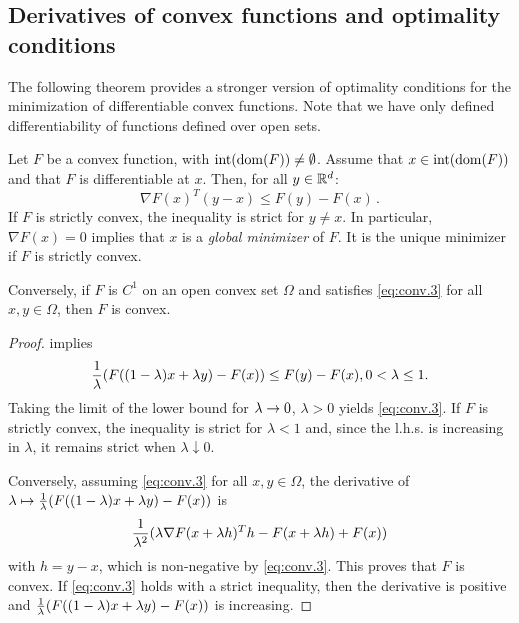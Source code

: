 \subsection{Derivatives of convex functions and optimality conditions}
 The following theorem provides a stronger version of optimality conditions for the minimization of differentiable convex functions. Note that we have only defined differentiability of functions defined over open sets. 
\begin{theorem}
Let $F$ be a convex function, with $\mathrm{int}({\mathrm{dom}}(F))\neq \emptyset$. Assume that
  $x\in \mathrm{int}({\mathrm{dom}}(F))$ and that $F$ is differentiable at $x$. Then, for all $y\in {\mathbb{R}}^d$:
\begin{equation}
\label{eq:conv.3}
\nabla F(x)^T(y-x) \leq F(y) - F(x)\,.
\end{equation}
If $F$ is strictly convex, the inequality is strict for $y\neq x$. 
In particular, $\nabla F(x) = 0$ implies that $x$ is a {\em global minimizer} of $F$. It is the unique minimizer if $F$ is strictly convex. 

Conversely, if $F$ is $C^1$ on an open convex set $\Omega$ and satisfies \cref{eq:conv.3} for all $x, y\in \Omega$, then $F$ is convex. 
\label{th:convex.gradient}
\end{theorem}
\begin{proof}
 implies
\[
\frac1{\lambda} (F((1-\lambda)x + \lambda y) - F(x)) \leq F(y) - F(x), 0<\lambda\leq 1.
\]
Taking the limit of the lower bound
 for $\lambda\to 0$, $\lambda >0$ yields \cref{eq:conv.3}. If $F$ is strictly convex, the inequality is strict for $\lambda < 1$ and, since the l.h.s. is increasing in $\lambda$, it remains strict when $\lambda \downarrow 0$.
 
 Conversely, assuming \cref{eq:conv.3} for all $x, y\in \Omega$, the derivative of $\lambda \mapsto \frac1{\lambda} (F((1-\lambda)x + \lambda y) - F(x))$ is 
\[
\frac{1}{\lambda^2}(\lambda\nabla F(x+\lambda h)^T h - F(x+\lambda h) + F(x))
\]
with $h = y-x$, which is non-negative by \cref{eq:conv.3}. This proves that  $F$ is convex.  If \cref{eq:conv.3} holds with a strict inequality, then the derivative is positive and $\frac1{\lambda} (F((1-\lambda)x + \lambda y) - F(x))$ is increasing.
\end{proof}

